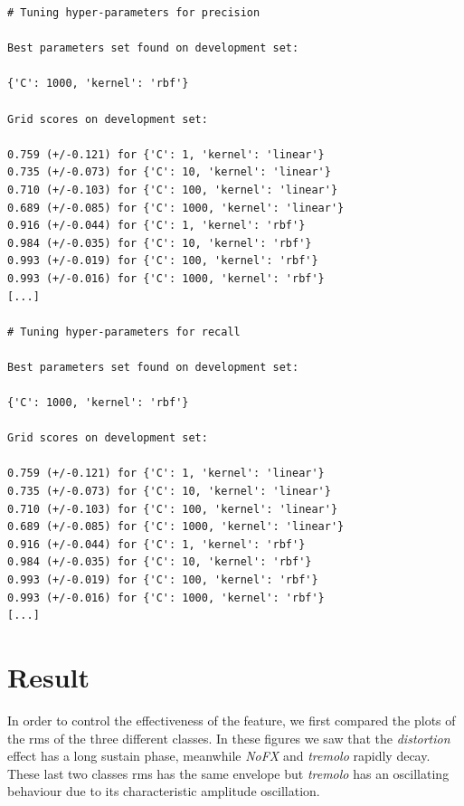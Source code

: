 \documentclass[a4paper,12pt]{report}
\begin{document}
\begin{verbatim}
# Tuning hyper-parameters for precision

Best parameters set found on development set:

{'C': 1000, 'kernel': 'rbf'}

Grid scores on development set:

0.759 (+/-0.121) for {'C': 1, 'kernel': 'linear'}
0.735 (+/-0.073) for {'C': 10, 'kernel': 'linear'}
0.710 (+/-0.103) for {'C': 100, 'kernel': 'linear'}
0.689 (+/-0.085) for {'C': 1000, 'kernel': 'linear'}
0.916 (+/-0.044) for {'C': 1, 'kernel': 'rbf'}
0.984 (+/-0.035) for {'C': 10, 'kernel': 'rbf'}
0.993 (+/-0.019) for {'C': 100, 'kernel': 'rbf'}
0.993 (+/-0.016) for {'C': 1000, 'kernel': 'rbf'}
[...]

# Tuning hyper-parameters for recall

Best parameters set found on development set:

{'C': 1000, 'kernel': 'rbf'}

Grid scores on development set:

0.759 (+/-0.121) for {'C': 1, 'kernel': 'linear'}
0.735 (+/-0.073) for {'C': 10, 'kernel': 'linear'}
0.710 (+/-0.103) for {'C': 100, 'kernel': 'linear'}
0.689 (+/-0.085) for {'C': 1000, 'kernel': 'linear'}
0.916 (+/-0.044) for {'C': 1, 'kernel': 'rbf'}
0.984 (+/-0.035) for {'C': 10, 'kernel': 'rbf'}
0.993 (+/-0.019) for {'C': 100, 'kernel': 'rbf'}
0.993 (+/-0.016) for {'C': 1000, 'kernel': 'rbf'}
[...]
\end{verbatim}
\newpage
\chapter{Result}

In order to control the effectiveness of the feature, we first compared the plots of the rms of the three different classes. In these figures we saw that the \emph{distortion} effect has a long sustain phase, meanwhile \emph{NoFX} and \emph{tremolo} rapidly decay. These last two classes rms has the same envelope but \emph{tremolo} has an oscillating behaviour due to its characteristic amplitude oscillation.\\
\end{document}

